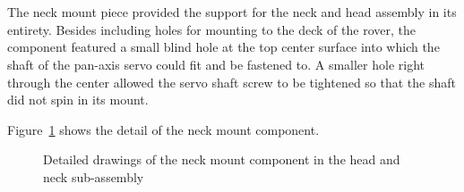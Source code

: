       \\\\
        The neck mount piece provided the support for the neck and head assembly in its entirety. Besides including holes for mounting to the deck of the rover, the component featured a small blind hole at the top center surface into which the shaft of the pan-axis servo could fit and be fastened to. A smaller hole right through the center allowed the servo shaft screw to be tightened so that the shaft did not spin in its mount.
        
        Figure~\ref{fig:mechDesign-neckMount} shows the detail of the neck mount component.

        \begin{figure}[H]
        \centering
        \caption[Detailed drawings of the neck mount component in the head and neck sub-assembly]{Detailed drawings of the neck mount component in the head and neck sub-assembly}
        \label{fig:mechDesign-neckMount}
        \end{figure}


